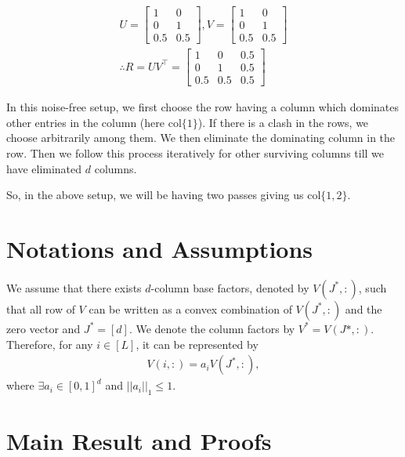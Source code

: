 \documentclass[twoside]{article}
\begin{document}
\begin{align*}
U = \begin{bmatrix}
    1 & 0 \\
    0 & 1 \\
    0.5 & 0.5
\end{bmatrix} , V= \begin{bmatrix}
    1 & 0 \\
    0 & 1 \\
    0.5 & 0.5
\end{bmatrix} \\
\therefore R = UV^{\intercal} = \begin{bmatrix}
    1 & 0 & 0.5\\
    0 & 1 & 0.5\\
    0.5 & 0.5 & 0.5
\end{bmatrix} 
\end{align*}

In this noise-free setup, we first choose the row having a column which dominates other entries in the column (here col$\lbrace 1\rbrace$). If there is a clash  in the rows, we choose arbitrarily among them. We then eliminate the dominating column in the row. Then we follow this process iteratively for other surviving columns till we have eliminated $d$ columns. 

So, in the above setup, we will be having two passes giving us col$\lbrace 1,2\rbrace$.



\section{Notations and Assumptions}

\begin{assumption}
\label{assm:1}
We assume that there exists $d$-column base factors, denoted by $V(J^*,:)$, such that all row of $V$ can be written as a convex combination of $V(J^*,:)$ and the zero vector and $J^* = [d]$. We denote the column factors by $V^* = V(J*,:)$. Therefore, for any $i\in [L]$, it can be represented by
\begin{align*}
V(i,:) = a_i V(J^*,:) , 
\end{align*}
where $\exists a_i\in [0,1]^{d}$ and $ ||a_i||_1 \leq 1$.
\end{assumption}

\section{Main Result and Proofs}
\end{document}
